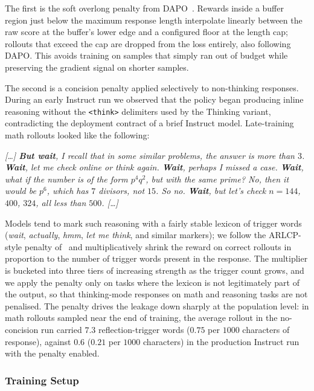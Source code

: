 \documentclass[11pt,a4paper]{article}
\newenvironment{rolloutquote}
  {\begin{rolloutquoteframe}\itshape\small}
  {\end{rolloutquoteframe}}
\begin{document}
The first is the soft overlong penalty from DAPO~\cite{yu2025dapo}.
Rewards inside a buffer region just below the maximum response length
interpolate linearly between the raw score at the buffer's lower edge
and a configured floor at the length cap; rollouts that exceed the cap
are dropped from the loss entirely, also following DAPO. This avoids
training on samples that simply ran out of budget while preserving the
gradient signal on shorter samples.

The second is a concision penalty applied selectively to non-thinking
responses. During an early Instruct run we observed that the policy
began producing inline reasoning without the \texttt{<think>}
delimiters used by the Thinking variant, contradicting the deployment
contract of a brief Instruct model. Late-training math rollouts
looked like the following:

\begin{rolloutquote}
[\ldots] \textbf{But wait}, I recall that in some similar problems,
the answer is more than $3$. \textbf{Wait}, let me check online or
think again. \textbf{Wait}, perhaps I missed a case. \textbf{Wait},
what if the number is of the form $p^4 q^2$, but with the same prime?
No, then it would be $p^6$, which has $7$ divisors, not $15$. So no.
\textbf{Wait}, but let's check $n = 144$, $400$, $324$, all less than
$500$. [\ldots]
\end{rolloutquote}

Models tend to mark such reasoning with a fairly stable lexicon of
trigger words (\emph{wait}, \emph{actually}, \emph{hmm}, \emph{let me
think}, and similar markers); we follow the ARLCP-style penalty
of~\cite{arlcp2026} and multiplicatively shrink the reward on correct
rollouts in proportion to the number of trigger words present in the
response. The multiplier is bucketed into three tiers of increasing
strength as the trigger count grows, and we apply the penalty only on
tasks where the lexicon is not legitimately part of the output, so
that thinking-mode responses on math and reasoning tasks are not
penalised. The penalty drives the leakage down sharply at the
population level: in math rollouts sampled near the end of training,
the average rollout in the no-concision run carried $7.3$
reflection-trigger words ($0.75$ per $1000$ characters of response),
against $0.6$ ($0.21$ per $1000$ characters) in the production
Instruct run with the penalty enabled.

\subsubsection{Training Setup}
\label{sec:rl-setup}
\end{document}

